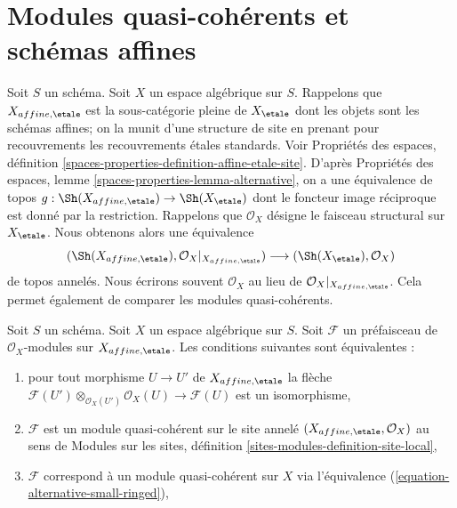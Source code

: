 \section{Modules quasi-cohérents et schémas affines}
\label{section-alternative-quasi-coherent}

\noindent
Soit $S$ un schéma. Soit $X$ un espace algébrique sur $S$.
Rappelons que $X_{affine, \etale}$ est la sous-catégorie pleine de $X_\etale$
dont les objets sont les schémas affines; on la munit d'une structure de site en prenant
pour recouvrements les recouvrements \'etales standards. Voir Propriétés des espaces, définition
\ref{spaces-properties-definition-affine-etale-site}.
D'après Propriétés des espaces, lemme \ref{spaces-properties-lemma-alternative},
on a une équivalence de topos
$g : \Sh(X_{affine, \etale}) \to \Sh(X_\etale)$
dont le foncteur image réciproque est donné par la restriction.
Rappelons que $\mathcal{O}_X$ désigne le faisceau structural sur
$X_\etale$. Nous obtenons alors une équivalence
\begin{equation}
\label{equation-alternative-small-ringed}
(\Sh(X_{affine, \etale}), \mathcal{O}_X|_{X_{affine, \etale}})
\longrightarrow
(\Sh(X_\etale), \mathcal{O}_X)
\end{equation}
de topos annelés. Nous écrirons souvent $\mathcal{O}_X$
au lieu de $\mathcal{O}_X|_{X_{affine, \etale}}$.
Cela permet également de comparer les modules quasi-cohérents.

\begin{lemma}
\label{lemma-quasi-coherent-alternative-small}
Soit $S$ un schéma. Soit $X$ un espace algébrique sur $S$.
Soit $\mathcal{F}$ un préfaisceau de $\mathcal{O}_X$-modules
sur $X_{affine, \etale}$. Les conditions suivantes sont équivalentes :
\begin{enumerate}
\item pour tout morphisme $U \to U'$ de $X_{affine, \etale}$ la flèche
$\mathcal{F}(U') \otimes_{\mathcal{O}_X(U')} \mathcal{O}_X(U)
\to \mathcal{F}(U)$ est un isomorphisme,
\item $\mathcal{F}$ est un module quasi-cohérent sur le site annelé
$(X_{affine, \etale}, \mathcal{O}_X)$ au sens de
Modules sur les sites, définition \ref{sites-modules-definition-site-local},
\item $\mathcal{F}$ correspond à un module quasi-cohérent sur $X$
via l'équivalence (\ref{equation-alternative-small-ringed}),
\end{enumerate}
\end{lemma}

